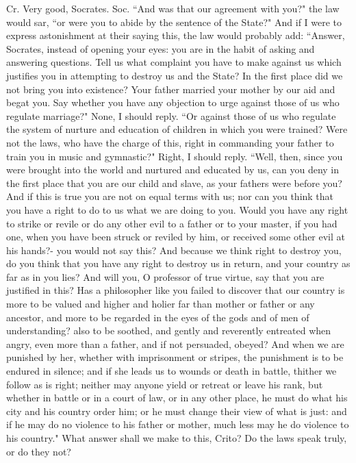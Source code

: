 Cr. Very good, Socrates. 
Soc. ``And was that our agreement with you?" the law would sar, ``or
were you to abide by the sentence of the State?" And if I were to
express astonishment at their saying this, the law would probably
add: ``Answer, Socrates, instead of opening your eyes: you are in the
habit of asking and answering questions. Tell us what complaint you
have to make against us which justifies you in attempting to destroy
us and the State? In the first place did we not bring you into existence?
Your father married your mother by our aid and begat you. Say whether
you have any objection to urge against those of us who regulate marriage?"
None, I should reply. ``Or against those of us who regulate the system
of nurture and education of children in which you were trained? Were
not the laws, who have the charge of this, right in commanding your
father to train you in music and gymnastic?" Right, I should reply.
``Well, then, since you were brought into the world and nurtured and
educated by us, can you deny in the first place that you are our child
and slave, as your fathers were before you? And if this is true you
are not on equal terms with us; nor can you think that you have a
right to do to us what we are doing to you. Would you have any right
to strike or revile or do any other evil to a father or to your master,
if you had one, when you have been struck or reviled by him, or received
some other evil at his hands?- you would not say this? And because
we think right to destroy you, do you think that you have any right
to destroy us in return, and your country as far as in you lies? And
will you, O professor of true virtue, say that you are justified in
this? Has a philosopher like you failed to discover that our country
is more to be valued and higher and holier far than mother or father
or any ancestor, and more to be regarded in the eyes of the gods and
of men of understanding? also to be soothed, and gently and reverently
entreated when angry, even more than a father, and if not persuaded,
obeyed? And when we are punished by her, whether with imprisonment
or stripes, the punishment is to be endured in silence; and if she
leads us to wounds or death in battle, thither we follow as is right;
neither may anyone yield or retreat or leave his rank, but whether
in battle or in a court of law, or in any other place, he must do
what his city and his country order him; or he must change their view
of what is just: and if he may do no violence to his father or mother,
much less may he do violence to his country." What answer shall we
make to this, Crito? Do the laws speak truly, or do they not?

